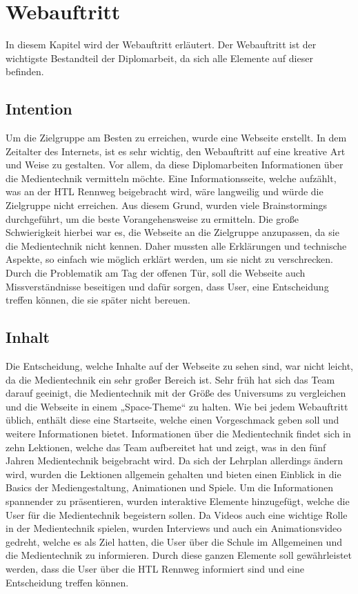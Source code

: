 \chapter{Webauftritt}
\renewcommand{\kapitelautor}{Autor: Hatice Akyokus}
In diesem Kapitel wird der Webauftritt erläutert. Der Webauftritt ist der wichtigste Bestandteil der Diplomarbeit, da sich alle Elemente auf dieser befinden.
 
\section{Intention}
Um die Zielgruppe am Besten zu erreichen, wurde eine Webseite erstellt. In dem Zeitalter des Internets, ist es sehr wichtig, den Webauftritt auf eine kreative Art und Weise zu gestalten. Vor allem, da diese Diplomarbeiten Informationen über die Medientechnik vermitteln möchte. Eine Informationsseite, welche aufzählt, was an der HTL Rennweg beigebracht wird, wäre langweilig und würde die Zielgruppe nicht erreichen. Aus diesem Grund, wurden viele Brainstormings durchgeführt, um die beste Vorangehensweise zu ermitteln. Die große Schwierigkeit hierbei war es, die Webseite an die Zielgruppe anzupassen, da sie die Medientechnik nicht kennen. Daher mussten alle Erklärungen und technische Aspekte, so einfach wie möglich erklärt werden, um sie nicht zu verschrecken. Durch die Problematik am Tag der offenen Tür, soll die Webseite auch Missverständnisse beseitigen und dafür sorgen, dass User, eine Entscheidung treffen können, die sie später nicht bereuen. 

\section{Inhalt}
Die Entscheidung, welche Inhalte auf der Webseite zu sehen sind, war nicht leicht, da die Medientechnik ein sehr großer Bereich ist. Sehr früh hat sich das Team darauf geeinigt, die Medientechnik mit der Größe des Universums zu vergleichen und die Webseite in einem „Space-Theme“ zu halten. Wie bei jedem Webauftritt üblich, enthält diese eine Startseite, welche einen Vorgeschmack geben soll und weitere Informationen bietet. Informationen über die Medientechnik findet sich in zehn Lektionen, welche das Team aufbereitet hat und zeigt, was in den fünf Jahren Medientechnik beigebracht wird. Da sich der Lehrplan allerdings ändern wird, wurden die Lektionen allgemein gehalten und bieten einen Einblick in die Basics der Mediengestaltung, Animationen und Spiele. Um die Informationen spannender zu präsentieren, wurden interaktive Elemente hinzugefügt, welche die User für die Medientechnik begeistern sollen. Da Videos auch eine wichtige Rolle in der Medientechnik spielen, wurden Interviews und auch ein Animationsvideo gedreht, welche es als Ziel hatten, die User über die Schule im Allgemeinen und die Medientechnik zu informieren. Durch diese ganzen Elemente soll gewährleistet werden, dass die User über die HTL Rennweg informiert sind und eine Entscheidung treffen können. 

